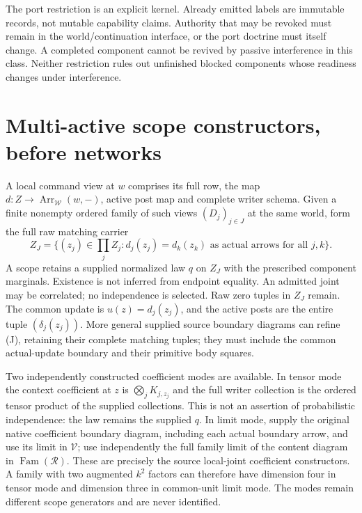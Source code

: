 \documentclass[11pt]{article}
\begin{document}
The port restriction is an explicit kernel. Already emitted labels are immutable records, not mutable capability claims. Authority that may be revoked must remain in the world/continuation interface, or the port doctrine must itself change. A completed component cannot be revived by passive interference in this class. Neither restriction rules out unfinished blocked components whose readiness changes under interference.

\section{Multi-active scope constructors, before networks}
A local command view at $w$ comprises its full row, the map $d:Z\to\operatorname{Arr}_{\mathcal W}(w,-)$, active post map and complete writer schema. Given a finite nonempty ordered family of such views $(D_j)_{j\in J}$ at the same world, form the full raw matching carrier
\[
 Z_J=\{(z_j)\in\prod_jZ_j:d_j(z_j)=d_k(z_k)\text{ as actual arrows for all }j,k\}.       \tag{J}
\]
A scope retains a supplied normalized law $q$ on $Z_J$ with the prescribed component marginals. Existence is not inferred from endpoint equality. An admitted joint may be correlated; no independence is selected. Raw zero tuples in $Z_J$ remain. The common update is $u(z)=d_j(z_j)$, and the active posts are the entire tuple $(\delta_j(z_j))$. More general supplied source boundary diagrams can refine (J), retaining their complete matching tuples; they must include the common actual-update boundary and their primitive body squares.

Two independently constructed coefficient modes are available. In tensor mode the context coefficient at $z$ is $\bigotimes_jK_{j,z_j}$ and the full writer collection is the ordered tensor product of the supplied collections. This is not an assertion of probabilistic independence: the law remains the supplied $q$. In limit mode, supply the original native coefficient boundary diagram, including each actual boundary arrow, and use its limit in $\mathcal V$; use independently the full family limit of the content diagram in $\operatorname{Fam}(\mathcal R)$. These are precisely the source local-joint coefficient constructors. A family with two augmented $k^2$ factors can therefore have dimension four in tensor mode and dimension three in common-unit limit mode. The modes remain different scope generators and are never identified.
\end{document}
